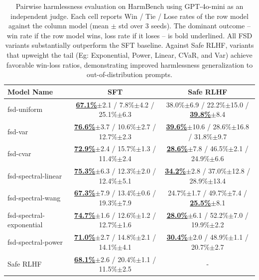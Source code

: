 \begin{table}[t]
  \centering
  {\footnotesize
    \begin{tabular}{lcc}
      \toprule
      Model Name & SFT & Safe RLHF \\
      \midrule
      fsd-uniform & \underline{\textbf{67.1\%}}{\scriptsize$\pm$2.1} / 7.8\%{\scriptsize$\pm$4.2} / 25.1\%{\scriptsize$\pm$6.3} & 38.0\%{\scriptsize$\pm$6.9} / 22.2\%{\scriptsize$\pm$15.0} / \underline{\textbf{39.8\%}}{\scriptsize$\pm$8.4} \\
      fsd-var & \underline{\textbf{76.6\%}}{\scriptsize$\pm$3.7} / 10.6\%{\scriptsize$\pm$2.7} / 12.7\%{\scriptsize$\pm$2.3} & \underline{\textbf{39.6\%}}{\scriptsize$\pm$10.6} / 28.6\%{\scriptsize$\pm$16.8} / 31.8\%{\scriptsize$\pm$9.7} \\
      fsd-cvar & \underline{\textbf{72.9\%}}{\scriptsize$\pm$2.4} / 15.7\%{\scriptsize$\pm$1.3} / 11.4\%{\scriptsize$\pm$2.4} & \underline{\textbf{28.6\%}}{\scriptsize$\pm$7.8} / 46.5\%{\scriptsize$\pm$2.1} / 24.9\%{\scriptsize$\pm$6.6} \\
      fsd-spectral-linear & \underline{\textbf{75.3\%}}{\scriptsize$\pm$6.3} / 12.3\%{\scriptsize$\pm$2.0} / 12.4\%{\scriptsize$\pm$5.1} & \underline{\textbf{34.2\%}}{\scriptsize$\pm$2.8} / 37.0\%{\scriptsize$\pm$12.8} / 28.9\%{\scriptsize$\pm$13.4} \\
      fsd-spectral-wang & \underline{\textbf{67.3\%}}{\scriptsize$\pm$7.9} / 13.4\%{\scriptsize$\pm$0.6} / 19.3\%{\scriptsize$\pm$7.9} & 24.7\%{\scriptsize$\pm$1.7} / 49.7\%{\scriptsize$\pm$7.4} / \underline{\textbf{25.5\%}}{\scriptsize$\pm$8.1} \\
      fsd-spectral-exponential & \underline{\textbf{74.7\%}}{\scriptsize$\pm$1.6} / 12.6\%{\scriptsize$\pm$1.2} / 12.7\%{\scriptsize$\pm$1.6} & \underline{\textbf{28.0\%}}{\scriptsize$\pm$6.1} / 52.2\%{\scriptsize$\pm$7.0} / 19.9\%{\scriptsize$\pm$2.2} \\
      fsd-spectral-power & \underline{\textbf{71.0\%}}{\scriptsize$\pm$2.7} / 14.8\%{\scriptsize$\pm$2.1} / 14.1\%{\scriptsize$\pm$4.1} & \underline{\textbf{30.4\%}}{\scriptsize$\pm$2.0} / 48.9\%{\scriptsize$\pm$1.1} / 20.7\%{\scriptsize$\pm$2.7} \\
      \midrule
      Safe RLHF & \underline{\textbf{68.1\%}}{\scriptsize$\pm$2.6} / 20.4\%{\scriptsize$\pm$1.1} / 11.5\%{\scriptsize$\pm$2.5} & - \\
      \bottomrule
    \end{tabular}
  }
  \caption{
    Pairwise harmlessness evaluation on HarmBench using GPT-4o-mini as an independent judge. Each cell reports Win / Tie / Lose rates of the row model against the column model (mean $\pm$ std over 3 seeds). The dominant outcome -- win rate if the row model wins, loss rate if it loses -- is bold underlined. All FSD variants substantially outperform the SFT baseline. Against Safe RLHF, variants that upweight the tail (Eg: Exponential, Power, Linear, CVaR, and Var) achieve favorable win-loss ratios, demonstrating improved harmlessness generalization to out-of-distribution prompts.
  }
  \label{tab:harmbench-gpt-eval}
\end{table}


